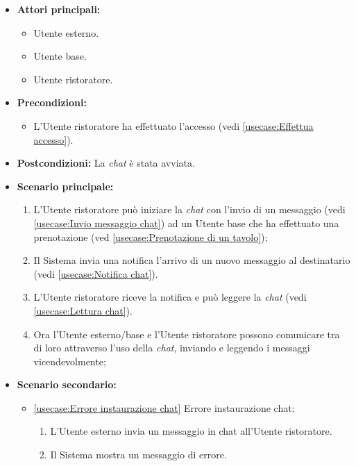 \label{usecase:Chat Utente ristoratore}
\begin{itemize}
	\item \textbf{Attori principali:} 
	\begin{itemize}
        \item Utente esterno.
        \item Utente base.
        \item Utente ristoratore.
    \end{itemize}

	\item \textbf{Precondizioni:}
	\begin{itemize}
        \item L'Utente ristoratore ha effettuato l'accesso (vedi \autoref{usecase:Effettua accesso}).
    \end{itemize}

	\item \textbf{Postcondizioni:} La \textit{chat} è stata avviata.

	\item \textbf{Scenario principale:}
            \begin{enumerate}
                \item L'Utente ristoratore può iniziare la \textit{chat} con l'invio di un messaggio (vedi \autoref{usecase:Invio messaggio chat}) ad un Utente base che ha effettuato una prenotazione (ved \autoref{usecase:Prenotazione di un tavolo});
                \item Il Sistema invia una notifica l'arrivo di un nuovo messaggio al destinatario (vedi \autoref{usecase:Notifica chat}).
                \item L'Utente ristoratore riceve la notifica e può leggere la \textit{chat} (vedi \autoref{usecase:Lettura chat}).
                \item Ora l'Utente esterno/base e l'Utente ristoratore possono comunicare tra di loro attraverso l'uso della \textit{chat}, inviando e leggendo i messaggi vicendevolmente;
	      \end{enumerate}

    \item \textbf{Scenario secondario:}
		  \begin{itemize}
			  \item \autoref{usecase:Errore instaurazione chat} Errore instaurazione chat:
				\begin{enumerate}
					\item L'Utente esterno invia un messaggio in chat all'Utente ristoratore.
					\item  Il Sistema mostra un messaggio di errore.
				\end{enumerate}
		  \end{itemize}
\end{itemize}